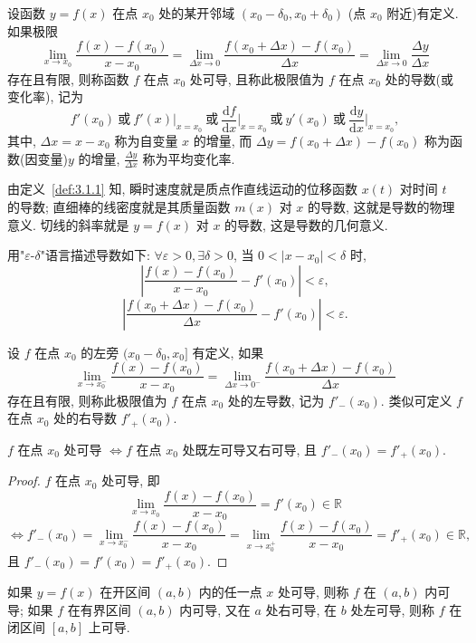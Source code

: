 \begin{definition}[导数]\label{def:3.1.1}
设函数 $y = f(x)$ 在点 $x_0$ 处的某开邻域 $(x_0 - \delta_0, x_0 + \delta_0)$ (点 $x_0$ 附近)有定义. 如果极限
\[
\lim_{x\to x_0}\frac{f(x) - f(x_0)}{x - x_0} = \lim_{\Delta x\to0}\frac{f(x_0+\Delta x) - f(x_0)}{\Delta x} = \lim_{\Delta x\to0}\frac{\Delta y}{\Delta x}
\]
存在且有限, 则称函数 $f$ 在点 $x_0$ 处可导, 且称此极限值为 $f$ 在点 $x_0$ 处的导数(或变化率), 记为
\[
f'(x_0)\ \text{或}\ f'(x)|_{x=x_0}\ \text{或}\ \frac{\mathrm{d}f}{\mathrm{d}x}\Big|_{x=x_0}\ \text{或}\ y'(x_0)\ \text{或}\ \frac{\mathrm{d}y}{\mathrm{d}x}\Big|_{x=x_0},
\]
其中, $\Delta x = x - x_0$ 称为自变量 $x$ 的增量, 而 $\Delta y = f(x_0+\Delta x) - f(x_0)$ 称为函数(因变量)$y$ 的增量, $\frac{\Delta y}{\Delta x}$ 称为平均变化率.
\end{definition}

由定义~\ref{def:3.1.1} 知, 瞬时速度就是质点作直线运动的位移函数 $x(t)$ 对时间 $t$ 的导数; 直细棒的线密度就是其质量函数 $m(x)$ 对 $x$ 的导数, 这就是导数的物理意义. 切线的斜率就是 $y = f(x)$ 对 $x$ 的导数, 这是导数的几何意义.

用"$\varepsilon$-$\delta$"语言描述导数如下: $\forall \varepsilon > 0, \exists \delta > 0$, 当 $0 < |x - x_0| < \delta$ 时,
\[
\left|\frac{f(x) - f(x_0)}{x - x_0} - f'(x_0)\right| < \varepsilon,
\]
\[
\left|\frac{f(x_0+\Delta x) - f(x_0)}{\Delta x} - f'(x_0)\right| < \varepsilon.
\]

设 $f$ 在点 $x_0$ 的左旁 $(x_0 - \delta_0, x_0]$ 有定义, 如果
\[
\lim_{x\to x_0^-}\frac{f(x) - f(x_0)}{x - x_0} = \lim_{\Delta x\to0^-}\frac{f(x_0+\Delta x) - f(x_0)}{\Delta x}
\]
存在且有限, 则称此极限值为 $f$ 在点 $x_0$ 处的左导数, 记为 $f'_-(x_0)$. 类似可定义 $f$ 在点 $x_0$ 处的右导数 $f'_+(x_0)$.

\begin{theorem}\label{thm:3.1.1}
$f$ 在点 $x_0$ 处可导 $\iff f$ 在点 $x_0$ 处既左可导又右可导, 且 $f'_-(x_0) = f'_+(x_0)$.
\end{theorem}

\begin{proof}
$f$ 在点 $x_0$ 处可导, 即
\[
\lim_{x\to x_0}\frac{f(x) - f(x_0)}{x - x_0} = f'(x_0) \in \mathbb{R}
\]
\[
\iff f'_-(x_0) = \lim_{x\to x_0^-}\frac{f(x) - f(x_0)}{x - x_0} = \lim_{x\to x_0^+}\frac{f(x) - f(x_0)}{x - x_0} = f'_+(x_0) \in \mathbb{R},
\]
且 $f'_-(x_0) = f'(x_0) = f'_+(x_0)$.
\end{proof}

\begin{definition}\label{def:3.1.2}
如果 $y = f(x)$ 在开区间 $(a,b)$ 内的任一点 $x$ 处可导, 则称 $f$ 在 $(a,b)$ 内可导; 如果 $f$ 在有界区间 $(a,b)$ 内可导, 又在 $a$ 处右可导, 在 $b$ 处左可导, 则称 $f$ 在闭区间 $[a,b]$ 上可导.
\end{definition}

